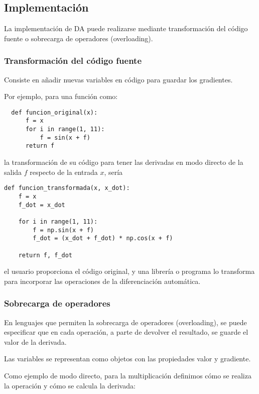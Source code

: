 \subsection{Implementación}

La implementación de DA puede realizarse mediante transformación del código
fuente o sobrecarga de operadores (overloading).

\subsubsection{Transformación del código fuente}

Consiste en añadir nuevas variables en código para guardar los gradientes.

Por ejemplo, para una función como:

\begin{verbatim}
  def funcion_original(x):
      f = x
      for i in range(1, 11):
          f = sin(x + f)
      return f
\end{verbatim}

la transformación de su código para tener las derivadas en modo directo de la
salida $f$ respecto de la entrada $x$, sería

\begin{verbatim}
def funcion_transformada(x, x_dot):
    f = x
    f_dot = x_dot

    for i in range(1, 11):
        f = np.sin(x + f)
        f_dot = (x_dot + f_dot) * np.cos(x + f)

    return f, f_dot
\end{verbatim}

el usuario proporciona el código original, y una librería o programa lo
transforma para incorporar las operaciones de la diferenciación automática.

\subsubsection{Sobrecarga de operadores}

En lenguajes que permiten la sobrecarga de operadores (overloading), se puede
especificar que en cada operación, a parte de devolver el resultado, se guarde
el valor de la derivada.

Las variables se representan como objetos con las propiedades valor y
gradiente.

Como ejemplo de modo directo, para la multiplicación definimos cómo se realiza
la operación y cómo se calcula la derivada:

